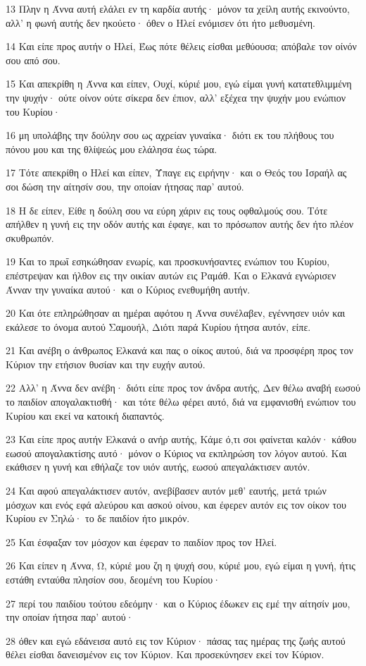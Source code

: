 \par 13 Πλην η Άννα αυτή ελάλει εν τη καρδία αυτής· μόνον τα χείλη αυτής εκινούντο, αλλ' η φωνή αυτής δεν ηκούετο· όθεν ο Ηλεί ενόμισεν ότι ήτο μεθυσμένη.
\par 14 Και είπε προς αυτήν ο Ηλεί, Έως πότε θέλεις είσθαι μεθύουσα; απόβαλε τον οίνόν σου από σου.
\par 15 Και απεκρίθη η Άννα και είπεν, Ουχί, κύριέ μου, εγώ είμαι γυνή κατατεθλιμμένη την ψυχήν· ούτε οίνον ούτε σίκερα δεν έπιον, αλλ' εξέχεα την ψυχήν μου ενώπιον του Κυρίου·
\par 16 μη υπολάβης την δούλην σου ως αχρείαν γυναίκα· διότι εκ του πλήθους του πόνου μου και της θλίψεώς μου ελάλησα έως τώρα.
\par 17 Τότε απεκρίθη ο Ηλεί και είπεν, Ύπαγε εις ειρήνην· και ο Θεός του Ισραήλ ας σοι δώση την αίτησίν σου, την οποίαν ήτησας παρ' αυτού.
\par 18 Η δε είπεν, Είθε η δούλη σου να εύρη χάριν εις τους οφθαλμούς σου. Τότε απήλθεν η γυνή εις την οδόν αυτής και έφαγε, και το πρόσωπον αυτής δεν ήτο πλέον σκυθρωπόν.
\par 19 Και το πρωΐ εσηκώθησαν ενωρίς, και προσκυνήσαντες ενώπιον του Κυρίου, επέστρεψαν και ήλθον εις την οικίαν αυτών εις Ραμάθ. Και ο Ελκανά εγνώρισεν Άνναν την γυναίκα αυτού· και ο Κύριος ενεθυμήθη αυτήν.
\par 20 Και ότε επληρώθησαν αι ημέραι αφότου η Άννα συνέλαβεν, εγέννησεν υιόν και εκάλεσε το όνομα αυτού Σαμουήλ, Διότι παρά Κυρίου ήτησα αυτόν, είπε.
\par 21 Και ανέβη ο άνθρωπος Ελκανά και πας ο οίκος αυτού, διά να προσφέρη προς τον Κύριον την ετήσιον θυσίαν και την ευχήν αυτού.
\par 22 Αλλ' η Άννα δεν ανέβη· διότι είπε προς τον άνδρα αυτής, Δεν θέλω αναβή εωσού το παιδίον απογαλακτισθή· και τότε θέλω φέρει αυτό, διά να εμφανισθή ενώπιον του Κυρίου και εκεί να κατοική διαπαντός.
\par 23 Και είπε προς αυτήν Ελκανά ο ανήρ αυτής, Κάμε ό,τι σοι φαίνεται καλόν· κάθου εωσού απογαλακτίσης αυτό· μόνον ο Κύριος να εκπληρώση τον λόγον αυτού. Και εκάθισεν η γυνή και εθήλαζε τον υιόν αυτής, εωσού απεγαλάκτισεν αυτόν.
\par 24 Και αφού απεγαλάκτισεν αυτόν, ανεβίβασεν αυτόν μεθ' εαυτής, μετά τριών μόσχων και ενός εφά αλεύρου και ασκού οίνου, και έφερεν αυτόν εις τον οίκον του Κυρίου εν Σηλώ· το δε παιδίον ήτο μικρόν.
\par 25 Και έσφαξαν τον μόσχον και έφεραν το παιδίον προς τον Ηλεί.
\par 26 Και είπεν η Άννα, Ω, κύριέ μου ζη η ψυχή σου, κύριέ μου, εγώ είμαι η γυνή, ήτις εστάθη ενταύθα πλησίον σου, δεομένη του Κυρίου·
\par 27 περί του παιδίου τούτου εδεόμην· και ο Κύριος έδωκεν εις εμέ την αίτησίν μου, την οποίαν ήτησα παρ' αυτού·
\par 28 όθεν και εγώ εδάνεισα αυτό εις τον Κύριον· πάσας τας ημέρας της ζωής αυτού θέλει είσθαι δανεισμένον εις τον Κύριον. Και προσεκύνησεν εκεί τον Κύριον.

